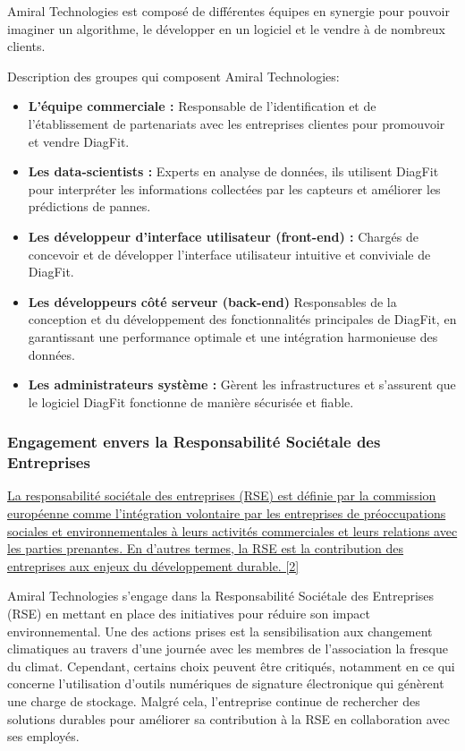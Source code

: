 Amiral Technologies est composé de différentes équipes en synergie pour pouvoir imaginer un algorithme, le développer en un logiciel et le vendre à de nombreux clients.

Description des groupes qui composent Amiral Technologies:
\begin{itemize}
    \item \textbf{L'équipe commerciale :} Responsable de l'identification et de l'établissement de partenariats avec les entreprises clientes pour promouvoir et vendre DiagFit.
    \item \textbf{Les data-scientists :} Experts en analyse de données, ils utilisent DiagFit pour interpréter les informations collectées par les capteurs et améliorer les prédictions de pannes.
    \item \textbf{Les développeur d'interface utilisateur (front-end) :} Chargés de concevoir et de développer l'interface utilisateur intuitive et conviviale de DiagFit.
    \item \textbf{Les développeurs côté serveur (back-end)} Responsables de la conception et du développement des fonctionnalités principales de DiagFit, en garantissant une performance optimale et une intégration harmonieuse des données.
    \item \textbf{Les administrateurs système :} Gèrent les infrastructures et s'assurent que le logiciel DiagFit fonctionne de manière sécurisée et fiable.
\end{itemize}

\subsubsection{Engagement envers la Responsabilité Sociétale des Entreprises}
\hyperref[rse]{La responsabilité sociétale des entreprises (RSE) est définie par la commission européenne comme l'intégration volontaire par les entreprises de préoccupations sociales et environnementales à leurs activités commerciales et leurs relations avec les parties prenantes.
En d'autres termes, la RSE est la contribution des entreprises aux enjeux du développement durable. [2]}

Amiral Technologies s'engage dans la Responsabilité Sociétale des Entreprises (RSE) en mettant en place des initiatives pour réduire son impact environnemental.
Une des actions prises est la sensibilisation aux changement climatiques au travers d'une journée avec les membres de l'association la fresque du climat.
Cependant, certains choix peuvent être critiqués, notamment en ce qui concerne l'utilisation d'outils numériques de signature électronique qui génèrent une charge de stockage.
Malgré cela, l'entreprise continue de rechercher des solutions durables pour améliorer sa contribution à la RSE en collaboration avec ses employés.

